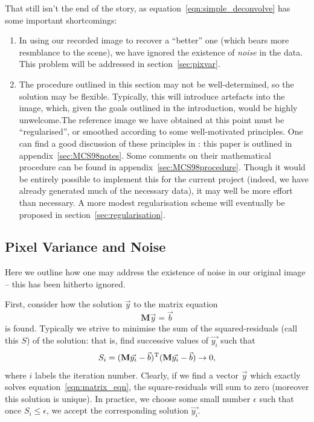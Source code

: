 \documentclass[letterpaper, 11pt]{article}
\def\ra{\ensuremath{\rightarrow}\xspace}
\begin{document}
That still isn't the end of the story, as equation~\ref{eqn:simple_deconvolve} has some important shortcomings:

\begin{enumerate}
	\item In using our recorded image to recover a ``better'' one (which bears more resmblance to the scene), we have ignored the existence of \emph{noise} in the data. This problem will be addressed in section~\vref{sec:pixvar}.
	
	\item The procedure outlined in this section may not be well-determined, so the solution may be flexible. Typically, this will introduce artefacts into the image, which, given the goals outlined in the introduction, would be highly unwelcome.\newline The reference image we have obtained at this point must be ``regularised'', or smoothed according to some well-motivated principles. One can find a good discussion of these principles in \citet{MCS98}: this paper is outlined in appendix~\ref{sec:MCS98notes}. Some comments on their mathematical procedure can be found in appendix~\ref{sec:MCS98procedure}. \newline Though it would be entirely possible to implement this for the current project (indeed, we have already generated much of the necessary data), it may well be more effort than necessary. A more modest regularisation scheme will eventually be proposed in section~\ref{sec:regularisation}.
\end{enumerate}




\subsection{Pixel Variance and Noise}
\label{sec:pixvar}

Here we outline how one may address the existence of noise in our original image -- this has been hitherto ignored.

First, consider how the solution $\vec y$ to the matrix equation
\begin{equation}
	\mathbf M \vec y = \vec b \label{eqn:matrix_eqn}
\end{equation}
is found. Typically we strive to minimise the sum of the squared-residuals (call this $S$) of the solution: that is, find successive values of $\vec {y_i}$ such that
\begin{equation} \label{eqn:sum_residuals}
	S_i = (\mathbf M \vec{y_i} - \vec b)^{\rm T}(\mathbf M \vec{y_i} - \vec b) \ra 0,
\end{equation}
where $i$ labels the iteration number. Clearly, if we find a vector $\vec y$ which exactly solves equation~\ref{eqn:matrix_eqn}, the square-residuals will sum to zero (moreover this solution is unique). In practice, we choose some small number $\epsilon$ such that once $S_i \leq \epsilon$, we accept the corresponding solution $\vec {y_i}$.
\end{document}

